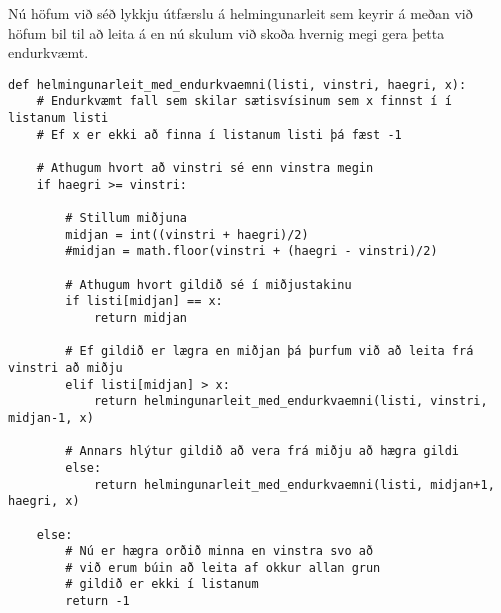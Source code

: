 Nú höfum við séð lykkju útfærslu á helmingunarleit sem keyrir á meðan við höfum bil til að leita á en nú skulum við skoða hvernig megi gera þetta endurkvæmt.

\begin{lstlisting}[caption=Helmingunarleit að tölu í röðuðum lista með endurkvæmni, label=lst:reiknirit-helm-end]
def helmingunarleit_med_endurkvaemni(listi, vinstri, haegri, x): 
	# Endurkvæmt fall sem skilar sætisvísinum sem x finnst í í listanum listi
	# Ef x er ekki að finna í listanum listi þá fæst -1
	
	# Athugum hvort að vinstri sé enn vinstra megin
	if haegri >= vinstri: 
	
		# Stillum miðjuna
		midjan = int((vinstri + haegri)/2)
		#midjan = math.floor(vinstri + (haegri - vinstri)/2)
		
		# Athugum hvort gildið sé í miðjustakinu
		if listi[midjan] == x: 
			return midjan 
		
		# Ef gildið er lægra en miðjan þá þurfum við að leita frá vinstri að miðju
		elif listi[midjan] > x: 
			return helmingunarleit_med_endurkvaemni(listi, vinstri, midjan-1, x) 
	
		# Annars hlýtur gildið að vera frá miðju að hægra gildi
		else: 
			return helmingunarleit_med_endurkvaemni(listi, midjan+1, haegri, x) 
	
	else: 
		# Nú er hægra orðið minna en vinstra svo að
		# við erum búin að leita af okkur allan grun
		# gildið er ekki í listanum
		return -1
\end{lstlisting}





\newpage
